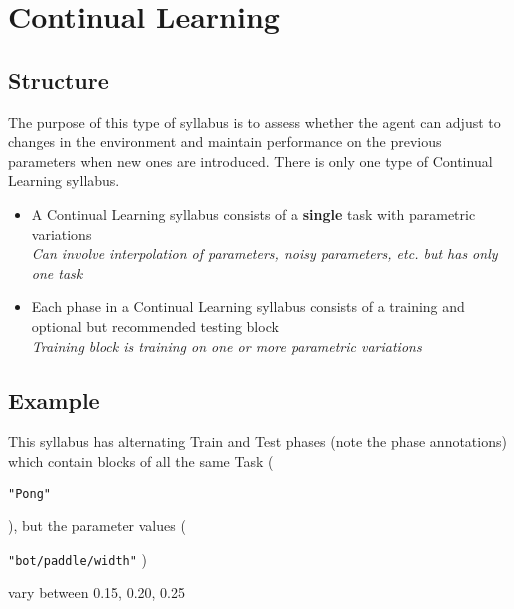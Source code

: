 \section{Continual Learning}
\subsection*{Structure}

The purpose of this type of syllabus is to assess whether the agent can adjust to changes in the environment and maintain performance on the previous parameters when new ones are introduced. There is only one type of Continual Learning syllabus.

\begin{itemize}
\item A Continual Learning syllabus consists of a \textbf{single} task with parametric variations\\
\textit{Can involve interpolation of parameters, noisy parameters, etc. but has only one task \\}


\item Each phase in a Continual Learning syllabus consists of a training and optional but recommended testing block\\
\textit{Training block is training on one or more parametric variations}\\[0.1in]
\end{itemize}

\subsection*{Example}

This syllabus has alternating Train and Test phases (note the phase annotations) which contain blocks of all the same Task (
\begin{small}
\verb|"Pong"|
\end{small}), but the parameter values (
\begin{small}
\verb|"bot/paddle/width"| )
\end{small}vary between 0.15, 0.20, 0.25

